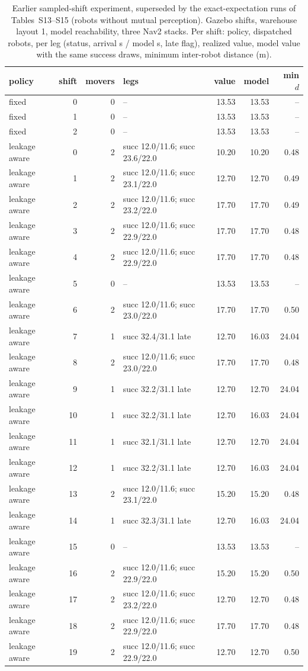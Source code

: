 \begin{table}[h]\centering\caption{Earlier sampled-shift experiment, superseded by the exact-expectation runs of Tables~S13--S15 (robots without mutual perception). Gazebo shifts, warehouse layout 1, model reachability, three Nav2 stacks. Per shift: policy, dispatched robots, per leg (status, arrival s / model s, late flag), realized value, model value with the same success draws, minimum inter-robot distance (m).}\scriptsize
\begin{tabular}{@{}lrrp{3.9cm}rrr@{}}\toprule policy & shift & movers & legs & value & model & min $d$\\\midrule
fixed & 0 & 0 & -- & 13.53 & 13.53 & --\\
fixed & 1 & 0 & -- & 13.53 & 13.53 & --\\
fixed & 2 & 0 & -- & 13.53 & 13.53 & --\\
leakage aware & 0 & 2 & succ 12.0/11.6; succ 23.6/22.0 & 10.20 & 10.20 & 0.48\\
leakage aware & 1 & 2 & succ 12.0/11.6; succ 23.1/22.0 & 12.70 & 12.70 & 0.49\\
leakage aware & 2 & 2 & succ 12.0/11.6; succ 23.2/22.0 & 17.70 & 17.70 & 0.49\\
leakage aware & 3 & 2 & succ 12.0/11.6; succ 22.9/22.0 & 17.70 & 17.70 & 0.48\\
leakage aware & 4 & 2 & succ 12.0/11.6; succ 22.9/22.0 & 17.70 & 17.70 & 0.48\\
leakage aware & 5 & 0 & -- & 13.53 & 13.53 & --\\
leakage aware & 6 & 2 & succ 12.0/11.6; succ 23.0/22.0 & 17.70 & 17.70 & 0.50\\
leakage aware & 7 & 1 & succ 32.4/31.1 late & 12.70 & 16.03 & 24.04\\
leakage aware & 8 & 2 & succ 12.0/11.6; succ 23.0/22.0 & 17.70 & 17.70 & 0.48\\
leakage aware & 9 & 1 & succ 32.2/31.1 late & 12.70 & 12.70 & 24.04\\
leakage aware & 10 & 1 & succ 32.2/31.1 late & 12.70 & 16.03 & 24.04\\
leakage aware & 11 & 1 & succ 32.1/31.1 late & 12.70 & 12.70 & 24.04\\
leakage aware & 12 & 1 & succ 32.2/31.1 late & 12.70 & 16.03 & 24.04\\
leakage aware & 13 & 2 & succ 12.0/11.6; succ 23.1/22.0 & 15.20 & 15.20 & 0.48\\
leakage aware & 14 & 1 & succ 32.3/31.1 late & 12.70 & 16.03 & 24.04\\
leakage aware & 15 & 0 & -- & 13.53 & 13.53 & --\\
leakage aware & 16 & 2 & succ 12.0/11.6; succ 22.9/22.0 & 15.20 & 15.20 & 0.50\\
leakage aware & 17 & 2 & succ 12.0/11.6; succ 23.2/22.0 & 12.70 & 12.70 & 0.48\\
leakage aware & 18 & 2 & succ 12.0/11.6; succ 22.9/22.0 & 17.70 & 17.70 & 0.48\\
leakage aware & 19 & 2 & succ 12.0/11.6; succ 22.9/22.0 & 12.70 & 12.70 & 0.50\\
\bottomrule\end{tabular}\end{table}
